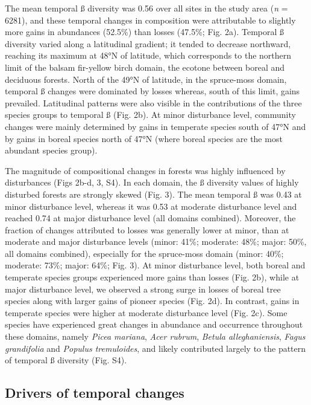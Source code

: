 \documentclass[a4paperpaper,]{article}
\begin{document}
The mean temporal ß diversity was 0.56 over all sites in the study area
(\emph{n} = 6281), and these temporal changes in composition were
attributable to slightly more gains in abundances (52.5\%) than losses
(47.5\%; Fig. 2a). Temporal ß diversity varied along a latitudinal
gradient; it tended to decrease northward, reaching its maximum at 48°N
of latitude, which corresponds to the northern limit of the balsam
fir-yellow birch domain, the ecotone between boreal and deciduous
forests. North of the 49°N of latitude, in the spruce-moss domain,
temporal ß changes were dominated by losses whereas, south of this
limit, gains prevailed. Latitudinal patterns were also visible in the
contributions of the three species groups to temporal ß (Fig. 2b). At
minor disturbance level, community changes were mainly determined by
gains in temperate species south of 47°N and by gains in boreal species
north of 47°N (where boreal species are the most abundant species
group).

The magnitude of compositional changes in forests was highly influenced
by disturbances (Figs 2b-d, 3, S4). In each domain, the ß diversity
values of highly disturbed forests are strongly skewed (Fig. 3). The
mean temporal ß was 0.43 at minor disturbance level, whereas it was 0.53
at moderate disturbance level and reached 0.74 at major disturbance
level (all domains combined). Moreover, the fraction of changes
attributed to losses was generally lower at minor, than at moderate and
major disturbance levels (minor: 41\%; moderate: 48\%; major: 50\%, all
domains combined), especially for the spruce-moss domain (minor: 40\%;
moderate: 73\%; major: 64\%; Fig. 3). At minor disturbance level, both
boreal and temperate species groups experienced more gains than losses
(Fig. 2b), while at major disturbance level, we observed a strong surge
in losses of boreal tree species along with larger gains of pioneer
species (Fig. 2d). In contrast, gains in temperate species were higher
at moderate disturbance level (Fig. 2c). Some species have experienced
great changes in abundance and occurrence throughout these domains,
namely \emph{Picea mariana}, \emph{Acer rubrum}, \emph{Betula
alleghaniensis}, \emph{Fagus grandifolia} and \emph{Populus
tremuloides}, and likely contributed largely to the pattern of temporal
ß diversity (Fig. S4).

\hypertarget{drivers-of-temporal-changes}{%
\subsection{Drivers of temporal
changes}\label{drivers-of-temporal-changes}}
\end{document}

